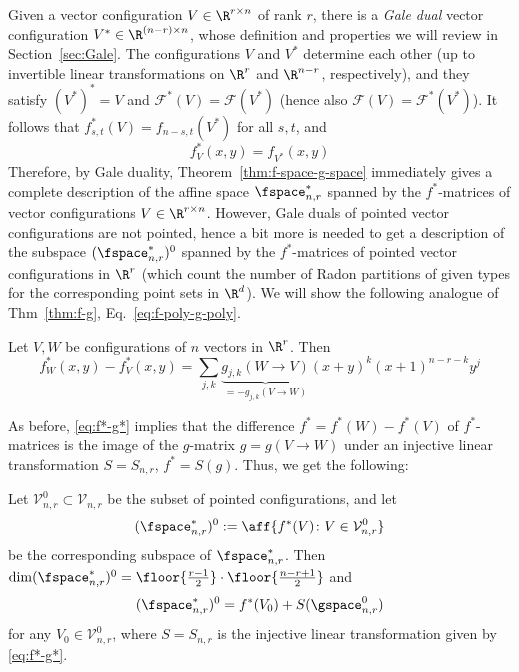 %
Given a vector configuration $V \in \R^{r\times n}$ of rank $r$, there is a \emph{Gale dual} vector configuration $V^*  \in \R^{(n-r)\times n}$, whose definition and properties we will review in Section~\ref{sec:Gale}. The configurations $V$ and $V^*$ determine each other (up to invertible linear transformations on $\R^r$ and $\R^{n-r}$, respectively), and they satisfy 
$(V^*)^*=V$ and $\mathcal{F}^*(V)=\mathcal{F}(V^*)$ (hence also $\mathcal{F}(V)=\mathcal{F}^*(V^*)$). It follows that
$f^*_{s,t}(V)=f_{n-s,t}(V^*)$ for all $s,t$, and 
\[
f^*_V(x,y)=f_{V^*}(x,y)
\]
Therefore, by Gale duality, Theorem~\ref{thm:f-space-g-space} immediately gives a complete description of the affine space 
$\fspace^*_{n,r}$ spanned by the $f^*$-matrices of vector configurations $V\in \R^{r\times n}$. However, Gale duals of pointed vector configurations are not pointed, hence a bit more is needed to get a description of the subspace 
$(\fspace^*_{n,r})^0$ spanned by the $f^*$-matrices of pointed vector configurations in $\R^r$ (which count the number of Radon partitions of given types for the corresponding point sets in $\R^d$). We will show the following analogue of Thm~\ref{thm:f-g}, Eq.~\eqref{eq:f-poly-g-poly}.
%
\begin{theorem}
\label{thm:f*-g*}
Let $V,W$ be configurations of $n$ vectors in $\R^r$. Then
\begin{equation}
\label{eq:f*-g*}
f^*_W(x,y) - f^*_{V}(x,y)= \sum_{j,k} \underbrace{g_{j,k}(W \to V)}_{=-g_{j,k}(V \to W)} (x+y)^k (x+1)^{n-r-k} y^j
\end{equation}
\end{theorem}
As before, \eqref{eq:f*-g*} implies that the difference $f^*=f^*(W)-f^*(V)$ of $f^*$-matrices is the image of the $g$-matrix $g=g(V\to W)$ under an injective linear transformation $S=S_{n,r}$, $f^*=S(g)$. Thus, we get the following:
%
\begin{theorem}
\label{thm:fstar-space-gstar-space-pointed}
Let $\mathcal{V}^0_{n,r} \subset \mathcal{V}_{n,r}$ be the subset of pointed configurations, and let  
\[
(\fspace^*_{n,r})^0:=\aff\{f^*(V)\colon V\in \mathcal{V}^0_{n,r}\}
\]
be the corresponding subspace of $\fspace^*_{n,r}$. Then $\dim (\fspace^*_{n,r})^0=\floor{\frac{r-1}{2}}\cdot \floor{\frac{n-r+1}{2}}$ and
\[ 
(\fspace^*_{n,r})^0=f^*(V_0)+S(\gspace^0_{n,r})
\]
for any $V_0 \in \mathcal{V}^0_{n,r}$, where $S=S_{n,r}$ is the injective linear transformation given by \eqref{eq:f*-g*}.
\end{theorem}

